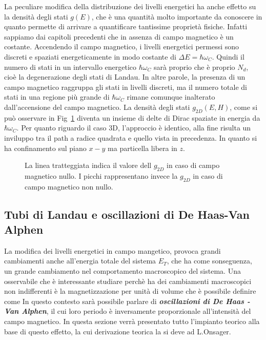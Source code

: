 La peculiare modifica della distribuzione dei livelli energetici ha anche effetto su la densit\`a degli stati $g(E)$, che \`e una quantit\`a molto importante da conoscere in quanto permette di arrivare a quantificare tantissime propriet\`a fisiche. Infatti sappiamo dai capitoli precedenti che 
in assenza di campo magnetico \`e un costante. Accendendo il campo magnetico, i livelli energetici permessi sono discreti e spaziati energeticamente in modo costante di $\Delta E = \hbar \omega_C$. Quindi il numero di stati in un intervallo energetico $\hbar\omega_C$ sar\`a proprio
che \`e proprio $N_d$, cio\`e la degenerazione degli stati di Landau. In altre parole, la presenza di un campo magnetico raggruppa gli stati in livelli discreti, ma il numero totale di stati in una regione pi\`u grande di $\hbar\omega_C$ rimane comunque inalterato dall'accensione del campo magnetico. La densit\`a degli stati $g_{2D}(E,H)$, come si pu\`o osservare in Fig~\ref{G2D:MAG} diventa un insieme di delte di Dirac spaziate in energia da $\hbar\omega_C$. Per quanto riguardo il caso 3D, l'approccio \`e identico, alla fine risulta un inviluppo tra il path a radice quadrata e quello vista in precedenza. In quanto si ha confinamento sul piano $x-y$ ma particella libera in $z$.
\begin{figure}
	\centering
	\caption{La linea tratteggiata indica il valore dell $g_{2D}$ in caso di campo magnetico nullo. I picchi rappresentano invece la $g_{2D}$ in caso di campo magnetico non nullo.}
	\label{G2D:MAG}
\end{figure}
\subsection{Tubi di Landau e oscillazioni di De Haas-Van Alphen}
La modifica dei livelli energetici in campo mangetico, provoca grandi cambiamenti anche all'energia totale del sistema $E_T$, che ha come sonseguenza, un grande cambiamento nel comportamento macroscopico del sistema. Una osservabile che \`e interessante studiare perch\`e ha dei cambiamenti macroscopici non indifferenti \`e la magnetizzazione per unit\`a di volume che \`e possibile definire come 
In questo contesto sar\`a possibile parlare di \textbf{\textit{ oscillazioni di De Haas - Van Alphen}}, il cui loro periodo \`e inversamente proporzionale all'intensit\`a del campo magnetico. In questa sezione verr\`a presentato tutto l'impianto teorico alla base di questo effetto, la cui derivazione teorica la si deve ad L.Onsager.

